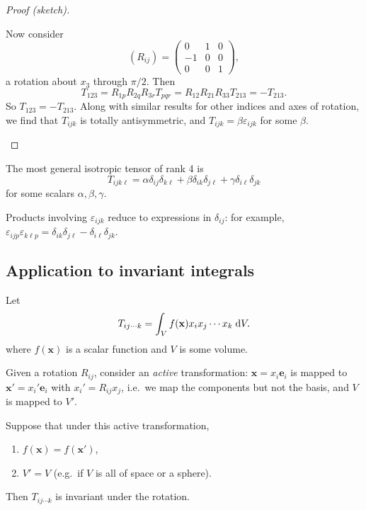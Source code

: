 \documentclass[a4paper]{article}
\begin{document}
\begin{proof}[Proof (sketch)]
\begin{enumerate}
      Now consider
      \[
        (R_{ij}) =
        \begin{pmatrix}
          0 & 1 & 0\\
          -1 & 0 & 0\\
          0 & 0 & 1
        \end{pmatrix},
      \]
      a rotation about $x_3$ through $\pi/2$. Then
      \[
        T_{123} = R_{1p}R_{2q}R_{3r}T_{pqr} = R_{12}R_{21}R_{33}T_{213} =-T_{213}.
      \]
      So $T_{123} = -T_{213}$. Along with similar results for other indices and axes of rotation, we find that $T_{ijk}$ is totally antisymmetric, and $T_{ijk} = \beta \varepsilon_{ijk}$ for some $\beta$.\qedhere
  \end{enumerate}
\end{proof}
\begin{eg}
  The most general isotropic tensor of rank 4 is
  \[
    T_{ijk\ell} = \alpha \delta_{ij}\delta_{k\ell} + \beta \delta_{ik}\delta_{j\ell} + \gamma \delta_{i\ell}\delta_{jk}
  \]
  for some scalars $\alpha, \beta, \gamma$.
\end{eg}

\begin{rmk}
  Products involving $\varepsilon_{ijk}$ reduce to expressions in $\delta_{ij}$: for example, $\varepsilon_{ijp}\varepsilon_{k\ell p} = \delta_{ik}\delta_{j\ell} - \delta_{i\ell}\delta_{jk}$.
\end{rmk}

\subsection{Application to invariant integrals}
\begin{thm}
  Let
  \[
    T_{ij\cdots k} = \int_V f(\mathbf{x}) x_i x_j \cdots x_k\;\mathrm{d} V.
  \]
  where $f(\mathbf{x})$ is a scalar function and $V$ is some volume.

  Given a rotation $R_{ij}$, consider an \emph{active} transformation: $\mathbf{x} = x_i \mathbf{e}_i$ is mapped to $\mathbf{x}' = x_i' \mathbf{e}_i$ with $x_i' = R_{ij} x_j$, i.e.\ we map the components but not the basis, and $V$ is mapped to $V'$.

  Suppose that under this active transformation,
  \begin{enumerate}
    \item $f(\mathbf{x}) = f(\mathbf{x}')$,
    \item $V' = V$ (e.g.\ if $V$ is all of space or a sphere).
  \end{enumerate}
  Then $T_{ij\cdots k}$ is invariant under the rotation.
\end{thm}
\end{document}
